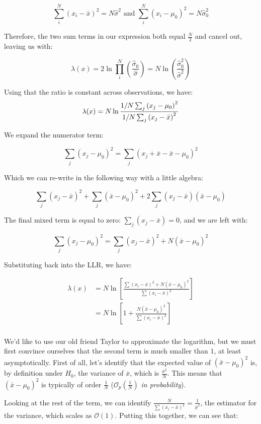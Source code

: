 	\[
	\sum_i^N\left(x_i-\bar{x}\right)^2=N\hat{\sigma}^2\text{ and }\sum_i^N\left(x_i-\mu_0\right)^2=N\hat{\sigma}_0^2
	\]

Therefore, the two sum terms in our expression both equal $\frac{N}{2}$ and cancel out, leaving us with:

	\[
	\lambda(x) = 2\ln\prod_i^N\left(\frac{\hat{\sigma}_0}{\hat{\sigma}}\right) = N\ln\left(\frac{\hat{\sigma}_0^2}{\hat{\sigma}^2}\right)
	\]

Using that the ratio is constant across observations, we have:
	\[
	\lambda(x) = N \ln\frac{1/N\sum_j\left(x_j-\mu_0\right)^2}{1/N\sum_j\left(x_j-\bar{x}\right)^2}\\
	\]

We expand the numerator term:

	\[
	\sum_j\left(x_j-\mu_0\right)^2 = \sum_j\left(x_j+\bar{x}-\bar{x}-\mu_0\right)^2
	\]

Which we can re-write in the following way with a little algebra:

	\[
	\sum_j\left(x_j-\bar{x}\right)^2 + \sum_j\left(\bar{x}-\mu_0\right)^2 + 2\sum_j\left(x_j-\bar{x}\right)\left(\bar{x}-\mu_0\right)
	\]

The final mixed term is equal to zero: $\sum_j\left(x_j-\bar{x}\right)=0$, and we are left with:

	\[
	\sum_j\left(x_j-\mu_0\right)^2 = \sum_j\left(x_j-\bar{x}\right)^2 + N\left(\bar{x}-\mu_0\right)^2
	\]

Substituting back into the LLR, we have:

\begin{align*}
	\lambda(x) &= N \ln \left[\frac{\sum (x_i - \bar{x})^2 + N(\bar{x} - \mu_0)^2}{\sum (x_i - \bar{x})^2} \right] \\
	&= N \ln \left[1 + \frac{N(\bar{x} - \mu_0)^2}{\sum (x_i - \bar{x})^2} \right] \\
\end{align*}

We'd like to use our old friend Taylor to approximate the logarithm, but we must first convince ourselves that the second term is much smaller than $1$, at least asymptotically.
First of all, let's identify that the expected value of $\left(\bar{x}-\mu_0\right)^2$ is, by definition under $H_0$, the variance of $\bar{x}$, which is $\frac{\sigma^2}{N}$. This means that $\left(\bar{x}-\mu_0\right)^2$ is typically of order $\frac{1}{N}$ ($\mathcal{O}_p(\frac{1}{N})$ \emph{in probability}).

Looking at the rest of the term, we can identify $\frac{N}{\sum (x_i - \bar{x})^2} = \frac{1}{\hat{\sigma}^2}$, the estimator for the variance, which scales as $\mathcal{O}(1)$. Putting this together, we can see that:

